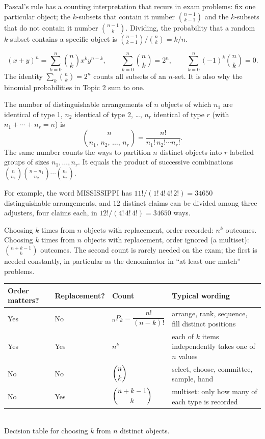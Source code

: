 Pascal's rule has a counting interpretation that recurs in exam problems: fix one particular
object; the $k$-subsets that contain it number $\binom{n-1}{k-1}$ and the $k$-subsets that
do not contain it number $\binom{n-1}{k}$. Dividing, the probability that a random $k$-subset
contains a specific object is $\binom{n-1}{k-1}/\binom{n}{k} = k/n$.

\begin{keyfact}
\[
(x+y)^n = \sum_{k=0}^{n} \binom{n}{k} x^k y^{n-k}, \qquad
\sum_{k=0}^{n}\binom{n}{k} = 2^n, \qquad
\sum_{k=0}^{n}(-1)^k\binom{n}{k} = 0 .
\]
The identity $\sum_k \binom{n}{k}=2^n$ counts all subsets of an $n$-set. It is also why the
binomial probabilities in Topic 2 sum to one.
\end{keyfact}

\begin{keyfact}
The number of distinguishable arrangements of $n$ objects of which $n_1$ are identical of
type 1, $n_2$ identical of type 2, \dots, $n_r$ identical of type $r$
(with $n_1+\cdots+n_r=n$) is
\[
\binom{n}{n_1,\,n_2,\,\dots,\,n_r} = \frac{n!}{n_1!\,n_2!\cdots n_r!} .
\]
The same number counts the ways to partition $n$ distinct objects into $r$ labelled groups
of sizes $n_1,\dots,n_r$. It equals the product of successive combinations
$\binom{n}{n_1}\binom{n-n_1}{n_2}\cdots\binom{n_r}{n_r}$.
\end{keyfact}

For example, the word MISSISSIPPI has $11!/(1!\,4!\,4!\,2!) = 34650$ distinguishable
arrangements, and $12$ distinct claims can be divided among three adjusters, four claims each,
in $12!/(4!\,4!\,4!) = 34650$ ways.

\begin{keyfact}
Choosing $k$ times from $n$ objects with replacement, order recorded: $n^k$ outcomes.
Choosing $k$ times from $n$ objects with replacement, order ignored (a multiset): $\binom{n+k-1}{k}$ outcomes.
The second count is rarely needed on the exam; the first is needed constantly, in particular
as the denominator in ``at least one match'' problems.
\end{keyfact}

\begin{center}
\begin{tabular}{llp{3.4cm}p{5.2cm}}
\toprule
Order matters? & Replacement? & Count & Typical wording \\
\midrule
Yes & No  & ${}_nP_k = \dfrac{n!}{(n-k)!}$ & arrange, rank, sequence, fill distinct positions \\[6pt]
Yes & Yes & $n^k$ & each of $k$ items independently takes one of $n$ values \\[4pt]
No  & No  & $\dbinom{n}{k}$ & select, choose, committee, sample, hand \\[6pt]
No  & Yes & $\dbinom{n+k-1}{k}$ & multiset: only how many of each type is recorded \\
\bottomrule
\end{tabular}
\\[4pt]
Decision table for choosing $k$ from $n$ distinct objects.
\end{center}

